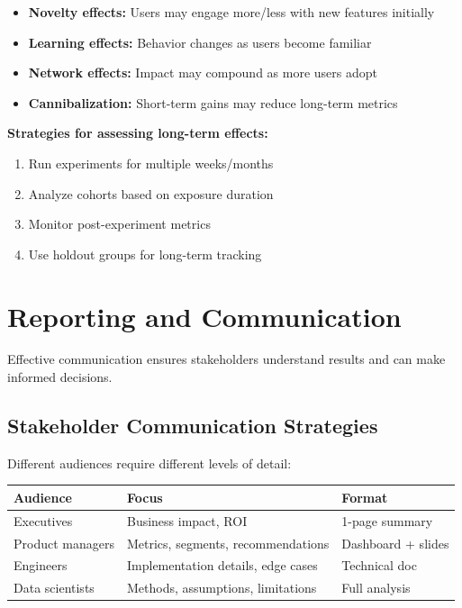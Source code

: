 \begin{itemize}
    \item \textbf{Novelty effects:} Users may engage more/less with new features initially
    \item \textbf{Learning effects:} Behavior changes as users become familiar
    \item \textbf{Network effects:} Impact may compound as more users adopt
    \item \textbf{Cannibalization:} Short-term gains may reduce long-term metrics
\end{itemize}

\textbf{Strategies for assessing long-term effects:}
\begin{enumerate}
    \item Run experiments for multiple weeks/months
    \item Analyze cohorts based on exposure duration
    \item Monitor post-experiment metrics
    \item Use holdout groups for long-term tracking
\end{enumerate}

\section{Reporting and Communication}

Effective communication ensures stakeholders understand results and can make informed decisions.

\subsection{Stakeholder Communication Strategies}

Different audiences require different levels of detail:

\begin{center}
\begin{tabular}{lll}
\toprule
\textbf{Audience} & \textbf{Focus} & \textbf{Format} \\
\midrule
Executives & Business impact, ROI & 1-page summary \\
Product managers & Metrics, segments, recommendations & Dashboard + slides \\
Engineers & Implementation details, edge cases & Technical doc \\
Data scientists & Methods, assumptions, limitations & Full analysis \\
\bottomrule
\end{tabular}
\end{center}

